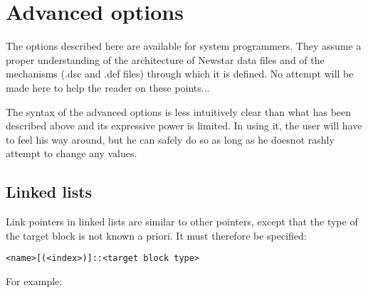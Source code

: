 \section{ Advanced options} 

	The options described here are available for system programmers. 
They assume a proper understanding of the architecture of Newstar data files
and of the mechanisms (.dsc and .def files) through which it is defined.  No
attempt will be made here to help the reader on these points... 

	The syntax of the advanced options is less intuitively clear than what
has been described above and its expressive power is limited. 
In using it, the user will have to feel his way around, but he can safely do so
as long as he doesnot rashly attempt to change any values. 


\subsection{ Linked lists} 

	Link pointers in linked lists are similar to other pointers, except
that the type of the target block is not known a priori.  It must therefore be
specified: 

	\verb+<name>[(<index>)]::<target block type>+ 

\noindent For example: 


